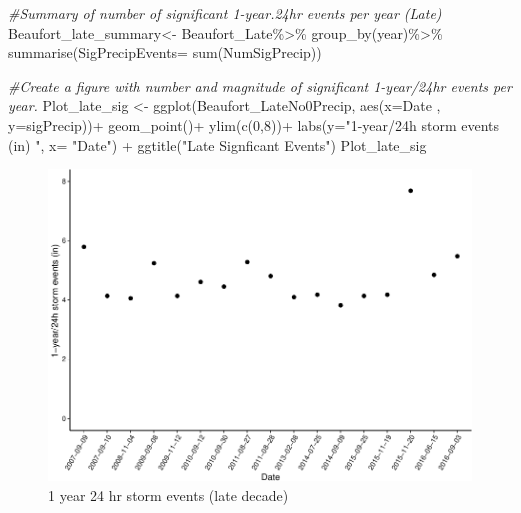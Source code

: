 \documentclass[
  12pt,
]{article}
\newenvironment{Shaded}{\begin{snugshade}}{\end{snugshade}}
\newcommand{\AttributeTok}[1]{\textcolor[rgb]{0.77,0.63,0.00}{#1}}
\newcommand{\CommentTok}[1]{\textcolor[rgb]{0.56,0.35,0.01}{\textit{#1}}}
\newcommand{\DecValTok}[1]{\textcolor[rgb]{0.00,0.00,0.81}{#1}}
\newcommand{\FunctionTok}[1]{\textcolor[rgb]{0.00,0.00,0.00}{#1}}
\newcommand{\NormalTok}[1]{#1}
\newcommand{\OtherTok}[1]{\textcolor[rgb]{0.56,0.35,0.01}{#1}}
\newcommand{\SpecialCharTok}[1]{\textcolor[rgb]{0.00,0.00,0.00}{#1}}
\newcommand{\StringTok}[1]{\textcolor[rgb]{0.31,0.60,0.02}{#1}}
\begin{document}
\begin{Shaded}
\begin{Highlighting}[]
\CommentTok{\#Summary of number of significant 1{-}year.24hr events per year (Late)}
\NormalTok{Beaufort\_late\_summary}\OtherTok{\textless{}{-}}\NormalTok{ Beaufort\_Late}\SpecialCharTok{\%\textgreater{}\%}
  \FunctionTok{group\_by}\NormalTok{(year)}\SpecialCharTok{\%\textgreater{}\%}
  \FunctionTok{summarise}\NormalTok{(}\AttributeTok{SigPrecipEvents=} \FunctionTok{sum}\NormalTok{(NumSigPrecip))}
\end{Highlighting}
\end{Shaded}

\begin{Shaded}
\begin{Highlighting}[]
\CommentTok{\#Create a figure with number and magnitude of significant 1{-}year/24hr events per year.}
\NormalTok{Plot\_late\_sig }\OtherTok{\textless{}{-}} \FunctionTok{ggplot}\NormalTok{(Beaufort\_LateNo0Precip, }
                        \FunctionTok{aes}\NormalTok{(}\AttributeTok{x=}\NormalTok{Date , }\AttributeTok{y=}\NormalTok{sigPrecip))}\SpecialCharTok{+}
  \FunctionTok{geom\_point}\NormalTok{()}\SpecialCharTok{+}
  \FunctionTok{ylim}\NormalTok{(}\FunctionTok{c}\NormalTok{(}\DecValTok{0}\NormalTok{,}\DecValTok{8}\NormalTok{))}\SpecialCharTok{+}
  \FunctionTok{labs}\NormalTok{(}\AttributeTok{y=}\StringTok{"1{-}year/24h storm events (in) "}\NormalTok{, }\AttributeTok{x=} \StringTok{"Date"}\NormalTok{) }\SpecialCharTok{+}
  \FunctionTok{ggtitle}\NormalTok{(}\StringTok{"Late Signficant Events"}\NormalTok{)}
\NormalTok{Plot\_late\_sig}
\end{Highlighting}
\end{Shaded}

\begin{figure}
\centering
\includegraphics{Final_Project_Thornton_Katayama_Ngenzi_files/figure-latex/late plot 1-1.pdf}
\caption{1 year 24 hr storm events (late decade)}
\end{figure}
\end{document}
